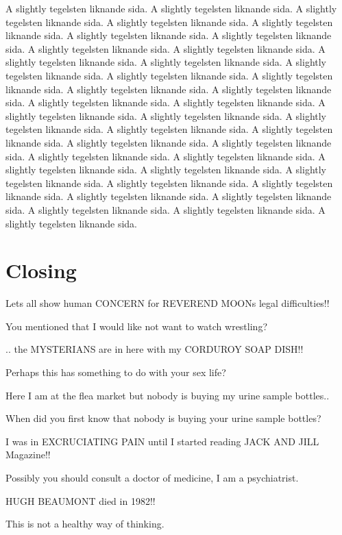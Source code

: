 \documentclass[cropmarks, frame, english]{idamasterthesis}
\begin{document}
A slightly tegelsten liknande sida. 
A slightly tegelsten liknande sida. 
A slightly tegelsten liknande sida. 
A slightly tegelsten liknande sida. 
A slightly tegelsten liknande sida. 
A slightly tegelsten liknande sida. 
A slightly tegelsten liknande sida. 
A slightly tegelsten liknande sida. 
A slightly tegelsten liknande sida. 
A slightly tegelsten liknande sida. 
A slightly tegelsten liknande sida. 
A slightly tegelsten liknande sida. 
A slightly tegelsten liknande sida. 
A slightly tegelsten liknande sida. 
A slightly tegelsten liknande sida. 
A slightly tegelsten liknande sida. 
A slightly tegelsten liknande sida. 
A slightly tegelsten liknande sida. 
A slightly tegelsten liknande sida. 
A slightly tegelsten liknande sida. 
A slightly tegelsten liknande sida. 
A slightly tegelsten liknande sida. 
A slightly tegelsten liknande sida. 
A slightly tegelsten liknande sida. 
A slightly tegelsten liknande sida. 
A slightly tegelsten liknande sida. 
A slightly tegelsten liknande sida. 
A slightly tegelsten liknande sida. 
A slightly tegelsten liknande sida. 
A slightly tegelsten liknande sida. 
A slightly tegelsten liknande sida. 
A slightly tegelsten liknande sida. 
A slightly tegelsten liknande sida. 
A slightly tegelsten liknande sida. 
A slightly tegelsten liknande sida. 
A slightly tegelsten liknande sida. 
A slightly tegelsten liknande sida. 

\chapter{Closing}


Lets all show human CONCERN for REVEREND MOONs legal difficulties!!

You mentioned that I would like not want to watch wrestling?

..  the MYSTERIANS are in here with my CORDUROY SOAP DISH!!

Perhaps this has something to do with your sex life?

Here I am at the flea market but nobody is buying
 my urine sample bottles..

When did you first know that nobody is buying your urine sample
bottles?

I was in EXCRUCIATING PAIN until I started reading JACK AND JILL
 Magazine!!

Possibly you should consult a doctor of medicine, I am a psychiatrist.

HUGH BEAUMONT died in 1982!!

This is not a healthy way of thinking.
\end{document}
